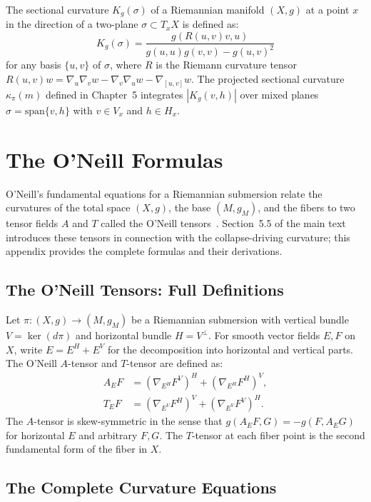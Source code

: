 \documentclass[12pt, oneside]{book}
\theoremstyle{plain-flyxion}
\theoremstyle{definition-flyxion}
\newcommand{\kpi}{\kappa_{\pi}}
\begin{document}
The sectional curvature $K_g(\sigma)$ of a Riemannian manifold $(X,g)$ at a point $x$ in
the direction of a two-plane $\sigma\subset T_xX$ is defined as:
\[
K_g(\sigma) = \frac{g(R(u,v)v,u)}{g(u,u)g(v,v) - g(u,v)^2}
\]
for any basis $\{u,v\}$ of $\sigma$, where $R$ is the Riemann curvature tensor
$R(u,v)w = \nabla_u\nabla_v w - \nabla_v\nabla_u w - \nabla_{[u,v]}w$. The projected
sectional curvature $\kpi(m)$ defined in Chapter~5 integrates $|K_g(v,h)|$ over mixed
planes $\sigma = \mathrm{span}\{v,h\}$ with $v\in V_x$ and $h\in H_x$.

\chapter{The O'Neill Formulas}

O'Neill's fundamental equations for a Riemannian submersion relate the curvatures of the
total space $(X,g)$, the base $(M, g_M)$, and the fibers to two tensor fields $A$ and $T$
called the O'Neill tensors~\cite{oneill1966}. Section~5.5 of the main text introduces
these tensors in connection with the collapse-driving curvature; this appendix provides
the complete formulas and their derivations.

\section*{The O'Neill Tensors: Full Definitions}

Let $\pi:(X,g)\to(M,g_M)$ be a Riemannian submersion with vertical bundle $V =
\ker(d\pi)$ and horizontal bundle $H = V^\perp$. For smooth vector fields $E, F$ on $X$,
write $E = E^H + E^V$ for the decomposition into horizontal and vertical parts. The
O'Neill $A$-tensor and $T$-tensor are defined as:
\begin{align*}
A_E F &= (\nabla_{E^H} F^V)^H + (\nabla_{E^H} F^H)^V, \\
T_E F &= (\nabla_{E^V} F^H)^V + (\nabla_{E^V} F^V)^H.
\end{align*}
The $A$-tensor is skew-symmetric in the sense that $g(A_E F, G) = -g(F, A_E G)$ for
horizontal $E$ and arbitrary $F, G$. The $T$-tensor at each fiber point is the second
fundamental form of the fiber in $X$.

\section*{The Complete Curvature Equations}
\end{document}

